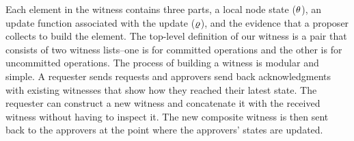 Each element in the witness contains three parts, a local node state ($\theta$), an update function associated with the update ($\varrho$), and the evidence that a proposer collects to build the element. 
The top-level definition of our witness is a pair that consists of two witness lists--one is for committed operations and the other is for uncommitted operations.
The process of building a witness is modular and simple. A requester sends
requests and approvers send back acknowledgments with existing witnesses that
show how they reached their latest state.
The requester can construct a new witness and concatenate it with the
received witness without having to inspect it.
The new composite witness is then sent back to the approvers at the point where
 the approvers' states are updated.


%
%
%
%
%
%
%

